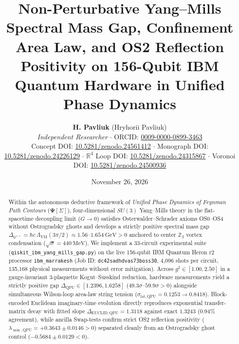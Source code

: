 \documentclass[11pt,a4paper]{article}
\title{\textbf{Non-Perturbative Yang--Mills Spectral Mass Gap, Confinement Area Law, and OS2 Reflection Positivity on 156-Qubit IBM Quantum Hardware in Unified Phase Dynamics}}
\author{\textbf{H. Pavliuk} (Hryhorii Pavliuk)\\
\textit{Independent Researcher} \quad $\cdot$ \quad ORCID: \href{https://orcid.org/0009-0000-0899-3463}{0009-0000-0899-3463}\\
\small Concept DOI: \href{https://doi.org/10.5281/zenodo.24561412}{10.5281/zenodo.24561412} $\cdot$ Monograph DOI: \href{https://doi.org/10.5281/zenodo.24226129}{10.5281/zenodo.24226129} $\cdot$ $\mathbb{R}^4$ Loop DOI: \href{https://doi.org/10.5281/zenodo.24315867}{10.5281/zenodo.24315867} $\cdot$ Voronoi DOI: \href{https://doi.org/10.5281/zenodo.24500936}{10.5281/zenodo.24500936}}
\date{November 26, 2026}
\begin{document}
\maketitle

\begin{abstract}
Within the autonomous deductive framework of \textit{Unified Phase Dynamics of Feynman Path Contours} ($\mathbf{\Psi}[\Sigma]$), four-dimensional $SU(3)$ Yang--Mills theory in the flat-spacetime decoupling limit ($G \to 0$) satisfies Osterwalder--Schrader axioms OS0--OS4 without Ostrogradsky ghosts and develops a strictly positive spectral mass gap $\Delta_{0^{++}} = \hbar c\,\Lambda_{\mathrm{YM}}(3\pi/2) \approx 1.56\text{--}1.654\ \mathrm{GeV} > 0$ anchored to center $\mathbb{Z}_3$ vortex condensation ($\sqrt{\sigma} = 440\ \mathrm{MeV}$). We implement a 33-circuit experimental suite (\texttt{qiskit\_ibm\_yang\_mills\_gap.py}) on the live 156-qubit IBM Quantum Heron r2 processor \texttt{ibm\_marrakesh} (Job ID: \texttt{dc42sadhdvas73boss30}, 4,096 shots per circuit, 135,168 physical measurements without error mitigation). Across $g^2 \in [1.00, 2.50]$ in a gauge-invariant 3-plaquette Kogut--Susskind reduction, hardware measurements yield a strictly positive gap $\Delta_{\mathrm{QPU}} \in [1.2396, 1.6258]$ ($49.3\sigma\text{--}59.9\sigma > 0$) alongside simultaneous Wilson-loop area-law string tension ($\sigma_{\mathrm{lat, QPU}} = 0.1253 \to 0.8418$). Block-encoded Euclidean imaginary-time evolution directly reproduces exponential transfer-matrix decay with fitted slope $\Delta_{\mathrm{EUCLID, QPU}} = 1.3118$ against exact $1.3243$ ($0.94\%$ agreement), while ancilla Swap-tests confirm strict OS2 reflection positivity ($\lambda_{\min,\mathrm{QPU}} = +0.3643 \pm 0.0146 > 0$) separated cleanly from an Ostrogradsky ghost control ($-0.5684 \pm 0.0129 < 0$).
\end{abstract}
\end{document}
